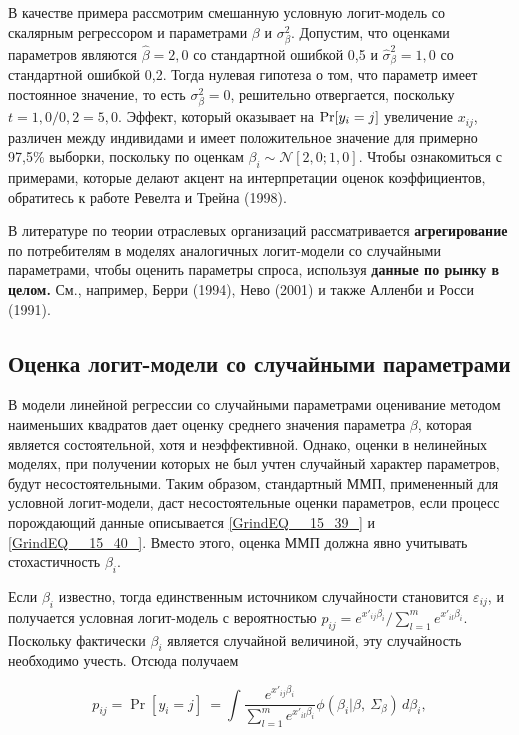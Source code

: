 В качестве примера рассмотрим смешанную условную логит-модель со скалярным регрессором и параметрами $\beta $ и ${\sigma }^2_{\beta }.$ Допустим, что оценками параметров являются $\widehat{\beta }=2,0$ со стандартной ошибкой 0,5 и ${\widehat{\sigma }}^2_{\beta }=1,0$ со стандартной ошибкой 0,2. Тогда нулевая гипотеза о том, что параметр имеет постоянное значение, то есть ${\sigma }^2_{\beta }=0$, решительно отвергается, поскольку $t=1,0/0,2=5,0.$ Эффект, который оказывает на ${\rm Pr}[y_i=j]$ увеличение $x_{ij}$, различен между индивидами и имеет положительное значение для примерно 97,5\% выборки, поскольку по оценкам ${\beta }_i\sim {\mathcal N}[2,0;1,0]$. Чтобы ознакомиться с примерами, которые делают акцент на интерпретации оценок коэффициентов, обратитесь к работе Ревелта и Трейна (1998).

В литературе по теории отраслевых организаций рассматривается \textbf{агрегирование} по потребителям в моделях аналогичных логит-модели со случайными параметрами, чтобы оценить параметры спроса, используя \textbf{данные по рынку в целом.} См., например, Берри (1994), Нево (2001) и также Алленби и Росси (1991).

\subsection{Оценка логит-модели со случайными параметрами}

В модели линейной регрессии со случайными параметрами оценивание методом наименьших квадратов дает оценку среднего значения параметра $\beta $, которая является состоятельной, хотя и неэффективной. Однако, оценки в нелинейных моделях, при получении которых не был учтен случайный характер параметров, будут несостоятельными. Таким образом, стандартный ММП, примененный для условной логит-модели, даст несостоятельные оценки параметров, если процесс порождающий данные описывается \eqref{GrindEQ__15_39_} и \eqref{GrindEQ__15_40_}. Вместо этого, оценка ММП должна явно учитывать стохастичность ${\beta }_i$.

Если ${\beta }_i$ известно, тогда единственным источником случайности становится ${\varepsilon }_{ij}$, и получается условная логит-модель с вероятностью $p_{ij}={e^{x'_{ij}{\beta }_i}}/{\sum^m_{l=1}{e^{x'_{il}{\beta }_i}}}$. Поскольку фактически ${\beta }_i$ является случайной величиной, эту случайность необходимо учесть. Отсюда получаем

\begin{equation} \label{GrindEQ__15_41_} 
p_{ij}={\Pr  \left[y_i=j\right]\ }=
\int{\frac{e^{x'_{ij}{\beta }_i}}{\sum^m_{l=1}{e^{x'_{il}{\beta }_i}}}\phi({\beta }_i|\beta ,\ {\Sigma }_{\beta })\,d{\beta }_i}, 
\end{equation} 

